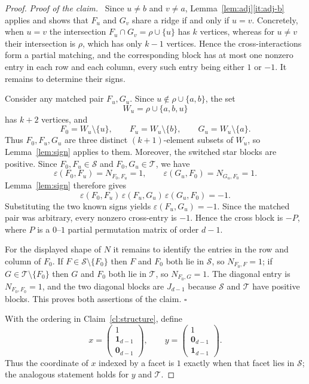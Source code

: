 \documentclass[11pt,reqno]{amsart}
\numberwithin{equation}{section}
\theoremstyle{plain}
\theoremstyle{definition}
\newenvironment{claimproof}
  {\par\smallskip\noindent\textit{Proof of the claim.}\ }
  {\hfill$\square$\par\smallskip}
\newcommand{\eps}{\varepsilon}
\newcommand{\ones}{\mathbf{1}}
\newcommand{\Sset}{\mathcal S}
\newcommand{\Tset}{\mathcal T}
\begin{document}
\begin{proof}
\begin{claimproof}
Since $u\ne b$ and $v\ne a$, Lemma~\ref{lem:adj}\ref{it:adj-b} applies and shows that $F_u$ and
$G_v$ share a ridge if and only if $u=v$. Concretely, when $u=v$ the intersection
$F_u\cap G_v=\rho\cup\{u\}$ has $k$ vertices, whereas for $u\ne v$ their intersection is $\rho$,
which has only $k-1$ vertices. Hence the cross-interactions form a partial matching, and the
corresponding block has at most one nonzero entry in each row and each column, every such entry
being either $1$ or $-1$. It remains to determine their signs.

Consider any matched pair $F_u,G_u$. Since $u\notin\rho\cup\{a,b\}$, the set
\[
  W_u=\rho\cup\{a,b,u\}
\]
has $k+2$ vertices, and
\[
  F_0=W_u\setminus\{u\},\qquad
  F_u=W_u\setminus\{b\},\qquad
  G_u=W_u\setminus\{a\} .
\]
Thus $F_0,F_u,G_u$ are three distinct $(k+1)$-element subsets of $W_u$, so
Lemma~\ref{lem:sign} applies to them. Moreover, the switched star blocks are positive. Since
$F_0,F_u\in\Sset$ and $F_0,G_u\in\Tset$, we have
\[
  \eps(F_0,F_u)=N_{F_0,F_u}=1,\qquad \eps(G_u,F_0)=N_{G_u,F_0}=1 .
\]
Lemma~\ref{lem:sign} therefore gives
\[
  \eps(F_0,F_u)\,\eps(F_u,G_u)\,\eps(G_u,F_0)=-1 .
\]
Substituting the two known signs yields $\eps(F_u,G_u)=-1$. Since the matched pair was
arbitrary, every nonzero cross-entry is $-1$. Hence the cross block is $-P$, where $P$ is a
$0$--$1$ partial permutation matrix of order $d-1$.

For the displayed shape of $N$ it remains to identify the entries in the row and column of
$F_0$. If $F\in\Sset\setminus\{F_0\}$ then $F$ and $F_0$ both lie in $\Sset$, so
$N_{F_0,F}=1$; if $G\in\Tset\setminus\{F_0\}$ then $G$ and $F_0$ both lie in $\Tset$, so
$N_{F_0,G}=1$. The diagonal entry is $N_{F_0,F_0}=1$, and the two diagonal blocks are $J_{d-1}$
because $\Sset$ and $\Tset$ have positive blocks. This proves both assertions of the claim.
\end{claimproof}

With the ordering in Claim~\ref{cl:structure}, define
\[
  x=\begin{pmatrix}1\\\ones_{d-1}\\\mathbf{0}_{d-1}\end{pmatrix},
  \qquad
  y=\begin{pmatrix}1\\\mathbf{0}_{d-1}\\\ones_{d-1}\end{pmatrix} .
\]
Thus the coordinate of $x$ indexed by a facet is $1$ exactly when that facet lies in $\Sset$;
the analogous statement holds for $y$ and $\Tset$.


\end{proof}
\end{document}
